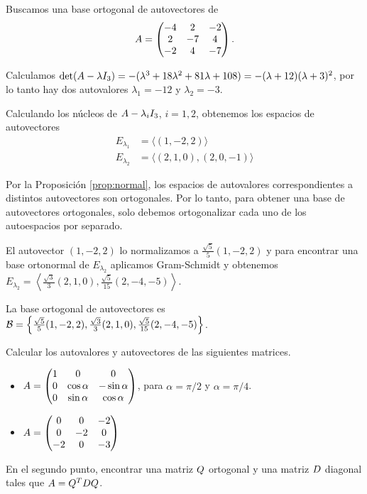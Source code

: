\begin{ejemplo}
Buscamos una base ortogonal de autovectores de
$$
\Ab = \begin{pmatrix} -4 & 2 & -2 \\ 2 & -7 & 4 \\ -2 & 4 & -7 \end{pmatrix}.$$

Calculamos $\det(\Ab - \lambda \Ib_3) = -(\lambda^3 + 18 \lambda^2 + 81 \lambda + 108) = -(\lambda + 12)(\lambda + 3)^2$, por lo tanto hay dos autovalores $\lambda_1 = -12$ y $\lambda_2 = -3$.

Calculando los núcleos de $\Ab - \lambda_i \Ib_3$, $i = 1, 2$, obtenemos los espacios de autovectores
$$
\begin{aligned}
E_{\lambda_1} &= \langle (1, -2, 2) \rangle \\
E_{\lambda_2} &= \langle (2, 1, 0), (2, 0, -1) \rangle
\end{aligned}
$$

Por la Proposición \ref{prop:normal}, los espacios de autovalores correspondientes a distintos autovectores son ortogonales. Por lo tanto, para obtener una base de autovectores ortogonales, solo debemos ortogonalizar cada uno de los autoespacios por separado.

El autovector $(1, -2, 2)$ lo normalizamos a $\frac{\sqrt{5}}{5}(1, -2, 2)$ y para encontrar una base ortonormal de $E_{\lambda_2}$ aplicamos Gram-Schmidt y obtenemos $E_{\lambda_2} = \left\langle \frac{\sqrt{3}}{3}(2, 1, 0), \frac{\sqrt{5}}{15}(2, -4, -5) \right\rangle$.

La base ortogonal de autovectores es $\mathcal B = \left\{\frac{\sqrt{5}}{5}(1, -2, 2), \frac{\sqrt{3}}{3}(2, 1, 0), \frac{\sqrt{5}}{15}(2, -4, -5)\right\}$.
\end{ejemplo}



\begin{ejercicio} Calcular los autovalores y autovectores de las siguientes
matrices.

\begin{itemize}
\item   $\Ab = \begin{pmatrix} 1 & 0 & 0 \\ 0 & \cos \alpha & -\sin \alpha \\ 0 & \sin \alpha & \cos \alpha \end{pmatrix}$,
    para $\alpha = \pi/2$ y $\alpha = \pi / 4$.
\item  $\Ab = \begin{pmatrix} 0 & 0 & -2 \\ 0 & -2 & 0 \\ -2 & 0 & -3 \end{pmatrix}$
\end{itemize}

En el segundo punto, encontrar una matriz $\Qb$ ortogonal y una matriz $\Db$
diagonal tales que $\Ab = \Qb^T \Db \Qb$.

\end{ejercicio}

